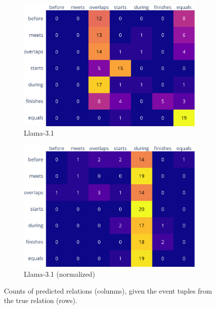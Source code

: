 \documentclass[11pt]{article}
\begin{document}
\begin{figure}
    \begin{subfigure}[b]{0.45\textwidth}
      \centering
      \includegraphics[width=0.95\columnwidth, height=0.75\textheight, keepaspectratio, valign=c]{../plots/meta-llama-3-1-8b_confusion_matrix_counts.pdf}
      \caption{Llama-3.1}
    \end{subfigure}
    \begin{subfigure}[b]{0.45\textwidth}
      \centering
      \includegraphics[width=0.95\columnwidth, height=0.75\textheight, keepaspectratio, valign=c]{../plots/meta-llama-3-1-8b_confusion_matrix_counts_normalized.pdf}
      \caption{Llama-3.1 (normalized)}
    \end{subfigure}
  \caption{Counts of predicted relations (columns), given the event tuples from the true relation (rows).}
  \label{fig:confusion_matrix_counts}
\end{figure}
\end{document}
